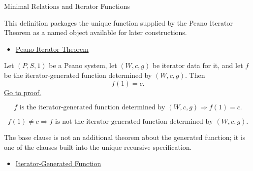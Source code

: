 \begin{topicbox}{Minimal Relations and Iterator Functions}
\begin{remark*}[Interpretation]
This definition packages the unique function supplied by the Peano Iterator
Theorem as a named object available for later constructions.
\end{remark*}

\begin{remark*}[Dependencies]
\begin{itemize}
  \item \hyperref[thm:peano-iterator-theorem]{Peano Iterator Theorem}
\end{itemize}
\end{remark*}

\begin{tcolorbox}[colback=thmbox, colframe=thmborder, arc=2pt,
  left=6pt, right=6pt, top=4pt, bottom=4pt,
  title={\small\textbf{Theorem (Iterator Base Clause)}},
  fonttitle=\small\bfseries]
\begin{theorem}
\label{thm:iterator-base-value}
Let $(P,S,1)$ be a Peano system, let $(W,c,g)$ be iterator data for it, and let
$f$ be the iterator-generated function determined by $(W,c,g)$. Then
\[
f(1)=c.
\]
\hyperref[prf:iterator-base-value]{Go to proof.}
\end{theorem}
\end{tcolorbox}

\begin{remark*}
\[
f \text{ is the iterator-generated function determined by } (W,c,g)
\Longrightarrow f(1)=c.
\]
\end{remark*}


\begin{remark*}
\[
f(1)\neq c
\Longrightarrow
f \text{ is not the iterator-generated function determined by } (W,c,g).
\]
\end{remark*}

\begin{remark*}[Interpretation]
The base clause is not an additional theorem about the generated function; it
is one of the clauses built into the unique recursive specification.
\end{remark*}

\begin{remark*}[Dependencies]
\begin{itemize}
  \item \hyperref[def:iterator-generated-function]{Iterator-Generated Function}
\end{itemize}
\end{remark*}


\end{topicbox}

